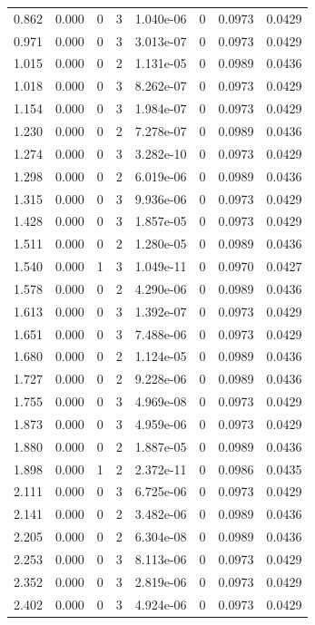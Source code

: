 \documentclass[preview]{standalone}
\begin{document}
{{\begin{tabular}{L{1.2cm}C{1.2cm} C{0.3cm}C{0.5cm} C{1.4cm}C{1.4cm} C{1.4cm}C{1.4cm}}
  0.862  &  0.000  & 0     &  3 &  1.040e-06  & 0  & 0.0973 &  0.0429   \\ 
  0.971  &  0.000  & 0     &  3 &  3.013e-07  & 0  & 0.0973 &  0.0429   \\ 
  1.015  &  0.000  & 0     &  2 &  1.131e-05  & 0  & 0.0989 &  0.0436   \\ 
  1.018  &  0.000  & 0     &  3 &  8.262e-07  & 0  & 0.0973 &  0.0429   \\ 
  1.154  &  0.000  & 0     &  3 &  1.984e-07  & 0  & 0.0973 &  0.0429   \\ 
  1.230  &  0.000  & 0     &  2 &  7.278e-07  & 0  & 0.0989 &  0.0436   \\ 
  1.274  &  0.000  & 0     &  3 &  3.282e-10  & 0  & 0.0973 &  0.0429   \\ 
  1.298  &  0.000  & 0     &  2 &  6.019e-06  & 0  & 0.0989 &  0.0436   \\ 
  1.315  &  0.000  & 0     &  3 &  9.936e-06  & 0  & 0.0973 &  0.0429   \\ 
  1.428  &  0.000  & 0     &  3 &  1.857e-05  & 0  & 0.0973 &  0.0429   \\ 
  1.511  &  0.000  & 0     &  2 &  1.280e-05  & 0  & 0.0989 &  0.0436   \\ 
  1.540  &  0.000  & 1     &  3 &  1.049e-11  & 0  & 0.0970 &  0.0427   \\ 
  1.578  &  0.000  & 0     &  2 &  4.290e-06  & 0  & 0.0989 &  0.0436   \\ 
  1.613  &  0.000  & 0     &  3 &  1.392e-07  & 0  & 0.0973 &  0.0429   \\ 
  1.651  &  0.000  & 0     &  3 &  7.488e-06  & 0  & 0.0973 &  0.0429   \\ 
  1.680  &  0.000  & 0     &  2 &  1.124e-05  & 0  & 0.0989 &  0.0436   \\ 
  1.727  &  0.000  & 0     &  2 &  9.228e-06  & 0  & 0.0989 &  0.0436   \\ 
  1.755  &  0.000  & 0     &  3 &  4.969e-08  & 0  & 0.0973 &  0.0429   \\ 
  1.873  &  0.000  & 0     &  3 &  4.959e-06  & 0  & 0.0973 &  0.0429   \\ 
  1.880  &  0.000  & 0     &  2 &  1.887e-05  & 0  & 0.0989 &  0.0436   \\ 
  1.898  &  0.000  & 1     &  2 &  2.372e-11  & 0  & 0.0986 &  0.0435   \\ 
  2.111  &  0.000  & 0     &  3 &  6.725e-06  & 0  & 0.0973 &  0.0429   \\ 
  2.141  &  0.000  & 0     &  2 &  3.482e-06  & 0  & 0.0989 &  0.0436   \\ 
  2.205  &  0.000  & 0     &  2 &  6.304e-08  & 0  & 0.0989 &  0.0436   \\ 
  2.253  &  0.000  & 0     &  3 &  8.113e-06  & 0  & 0.0973 &  0.0429   \\ 
  2.352  &  0.000  & 0     &  3 &  2.819e-06  & 0  & 0.0973 &  0.0429   \\ 
  2.402  &  0.000  & 0     &  3 &  4.924e-06  & 0  & 0.0973 &  0.0429   \\ 
\hline 
\end{tabular} 

}}
\end{document}
